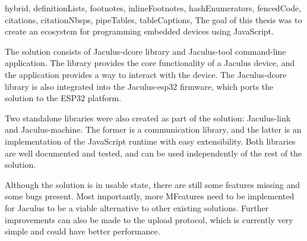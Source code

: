 \begin{markdown*}{%
  hybrid,
  definitionLists,
  footnotes,
  inlineFootnotes,
  hashEnumerators,
  fencedCode,
  citations,
  citationNbsps,
  pipeTables,
  tableCaptions,
}
The goal of this thesis was to create an ecosystem for programming embedded devices using JavaScript.

The solution consists of Jaculus-dcore library and Jaculus-tool command-line application. The library provides the core functionality of a Jaculus device, and the application provides a way to interact with the device. The Jaculus-dcore library is also integrated into the Jaculus-esp32 firmware, which ports the solution to the ESP32 platform.

Two standalone libraries were also created as part of the solution: Jaculus-link and Jaculus-machine. The former is a communication library, and the latter is an implementation of the JavaScript runtime with easy extensibility. Both libraries are well documented and tested, and can be used independently of the rest of the solution.

Although the solution is in usable state, there are still some features missing and some bugs present. Most importantly, more MFeatures need to be implemented for Jaculus to be a viable alternative to other existing solutions. Further improvements can also be made to the upload protocol, which is currently very simple and could have better performance.

\end{markdown*}
